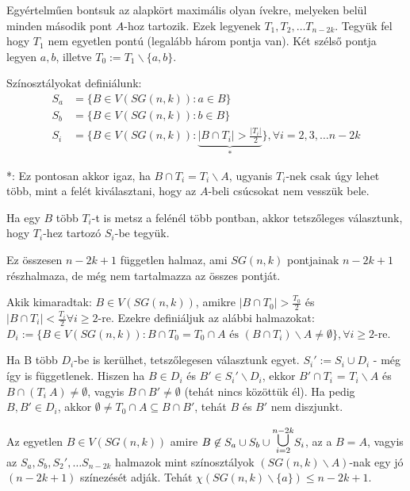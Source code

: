 \medskip

Egyértelműen bontsuk az alapkört maximális olyan ívekre, melyeken belül minden második pont $A$-hoz tartozik. Ezek legyenek $T_1, T_2, \dots T_{n-2k}$. Tegyük fel hogy $T_1$ nem egyetlen pontú (legalább három pontja van). Két szélső pontja legyen $a, b$, illetve $T_0 := T_1 \backslash \{a, b\}$.

\medskip

Színosztályokat definiálunk:
\begin{align}
  S_a &= \{B \in V(SG(n,k)): a \in B\} \\
  S_b &= \{B \in V(SG(n,k)): b \in B\} \\
  S_i &= \{B \in V(SG(n,k)): \underbrace{|B \cap T_i| > \frac{|T_i|}{2}}_{*}\}, \forall i = 2,3, \dots n-2k
\end{align}

*: Ez pontosan akkor igaz, ha $B \cap T_i = T_i \backslash A$, ugyanis $T_i$-nek csak úgy lehet több, mint a felét kiválasztani, hogy az $A$-beli csúcsokat nem vesszük bele.

\medskip

Ha egy $B$ több $T_i$-t is metsz a felénél több pontban, akkor tetszőleges választunk, hogy $T_i$-hez tartozó $S_i$-be tegyük.

\medskip

Ez összesen $n-2k+1$ független halmaz, ami $SG(n,k)$ pontjainak $n-2k+1$ részhalmaza, de még nem tartalmazza az összes pontját.

\medskip

Akik kimaradtak: $B \in V(SG(n,k))$, amikre $|B \cap T_0| > \frac{T_0}{2}$ és $|B \cap T_i| < \frac{T_i}{2} \forall i \geq 2$-re. Ezekre definiáljuk az alábbi halmazokat: $D_i := \{B \in V(SG(n,k)): B \cap T_0 = T_0 \cap A \text{~és~} (B \cap T_i) \backslash A \not = \emptyset\}, \forall i \geq 2$-re.

\medskip

Ha B több $D_i$-be is kerülhet, tetszőlegesen választunk egyet. $S_i' := S_i \cup D_i$ - még így is függetlenek. Hiszen ha $B \in D_i$ és $B' \in S_i' \backslash D_i$, ekkor $B' \cap T_i$ = $T_i \backslash A$ és $B \cap (T_i \ A) \not = \emptyset$, vagyis $B \cap B' \not = \emptyset$ (tehát nincs közöttük él). Ha pedig $B, B' \in D_i$, akkor $\emptyset \not = T_0 \cap A \subseteq B \cap B'$, tehát $B$ és $B'$ nem diszjunkt.

Az egyetlen $B \in V(SG(n,k))$ amire $B \not \in S_a \cup S_b \cup \cuploop{n-2k}{i=2} S_i$, az a $B=A$, vagyis az $S_a, S_b, S_2', \dots S_{n-2k}$ halmazok mint színosztályok $(SG(n,k) \backslash A)$-nak egy jó $(n-2k+1)$ színezését adják. Tehát $\chi(SG(n,k) \backslash \{a\}) \leq n - 2k + 1$.

\QED

